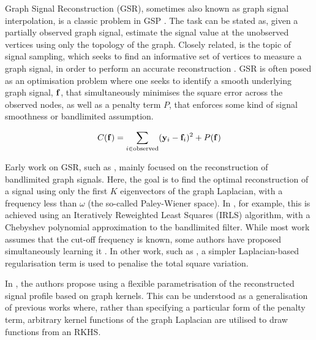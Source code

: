 \label{sec:GSR_review}

Graph Signal Reconstruction (GSR), sometimes also known as graph signal interpolation, is a classic problem in GSP \citep{Ortega2018}. The task can be stated as, given a partially observed graph signal, estimate the signal value at the unobserved vertices using only the topology of the graph. Closely related, is the topic of signal sampling, which seeks to find an informative set of vertices to measure a graph signal, in order to perform an accurate reconstruction \citep{Tanaka2020}. GSR is often posed as an optimisation problem where one seeks to identify a smooth underlying graph signal, $\mathbf{f}$, that simultaneously minimises the square error across the observed nodes, as well as a penalty term $P$, that enforces some kind of signal smoothness or bandlimited assumption. 

\begin{equation}
    C(\mathbf{f}) = \sum_{i \in \text{observed}} (\mathbf{y}_i - \mathbf{f}_i)^2 + P(\mathbf{f})
\end{equation}

Early work on GSR, such as \cite{Narang2013, Wang2015b, Anis2016}, mainly focused on the reconstruction of bandlimited graph signals. Here, the goal is to find the optimal reconstruction of a signal using only the first $K$ eigenvectors of the graph Laplacian, with a frequency less than $\omega$ (the so-called Paley-Wiener space). In \cite{Narang2013}, for example, this is achieved using an Iteratively Reweighted Least Squares (IRLS) algorithm, with a Chebyshev polynomial approximation to the bandlimited filter. While most work assumes that the cut-off frequency is known, some authors have proposed simultaneously learning it \citep{Varma2015, Marques2016}. In other work, such as \citep{Belkin2004b, Narang2013c, Chen2015}, a simpler Laplacian-based regularisation term is used to penalise the total square variation.

In \citep{Romero2017b}, the authors propose using a flexible parametrisation of the reconstructed signal profile based on graph kernels. This can be understood as a generalisation of previous works where, rather than specifying a particular form of the penalty term, arbitrary kernel functions of the graph Laplacian are utilised to draw functions from an RKHS.

